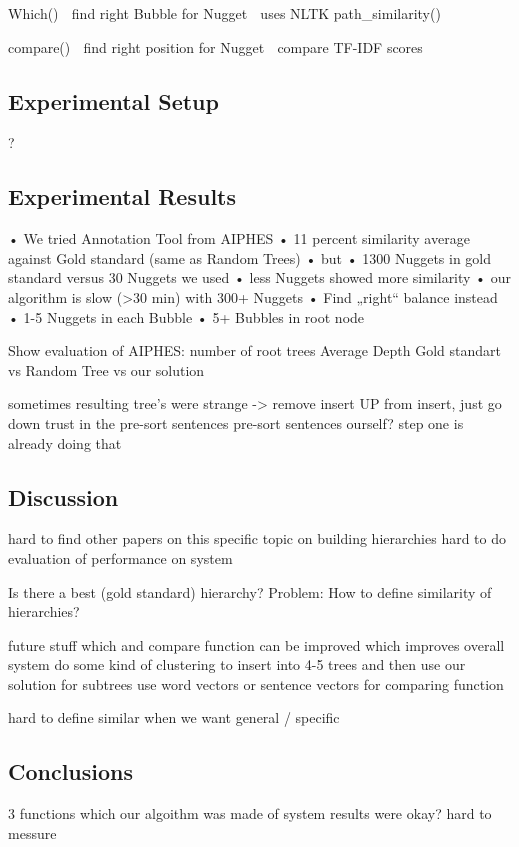 Which()
 find right Bubble for Nugget
 uses NLTK path_similarity()

compare()
 find right position for Nugget
 compare TF-IDF scores

\subsection{Experimental Setup}

?

\subsection{Experimental Results}

• We tried Annotation Tool from AIPHES
• 11 percent similarity average against Gold standard (same as Random Trees)
• but
• 1300 Nuggets in gold standard versus 30 Nuggets we used
• less Nuggets showed more similarity
• our algorithm is slow (>30 min) with 300+ Nuggets
• Find „right“ balance instead
• 1-5 Nuggets in each Bubble
• 5+ Bubbles in root node

Show evaluation of AIPHES:
	number of root trees
	Average Depth
	Gold standart vs Random Tree vs our solution

sometimes resulting tree's were strange
-> remove insert UP from insert, just go down
trust in the pre-sort sentences
pre-sort sentences ourself? step one is already doing that

\subsection{Discussion}

hard to find other papers on this specific topic on building hierarchies
hard to do evaluation of performance on system

Is there a best (gold standard) hierarchy?
Problem: How to define similarity of hierarchies?

future stuff
which and compare function can be improved which improves overall system
do some kind of clustering to insert into 4-5 trees and then use our solution for subtrees
use word vectors or sentence vectors for comparing function

hard to define similar when we want general / specific

\subsection{Conclusions}

3 functions which our algoithm was made of
system results were okay?
hard to messure


